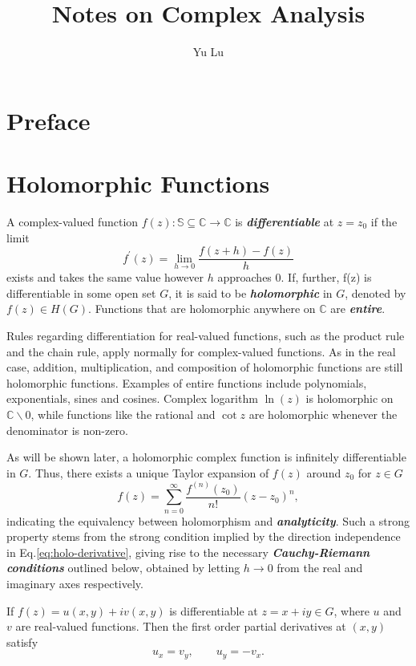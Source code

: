 \documentclass{article}
\title{Notes on Complex Analysis}
\author{Yu Lu}
\begin{document}
\maketitle
\section*{Preface}
\section{Holomorphic Functions} 
A complex-valued function $
    f(z)\colon \mathbb{S}\subseteq \mathbb{C} \to \mathbb{C}
$
is \textit{\textbf{differentiable}} at $z=z_0$ if the limit 
\begin{equation}
    f^\prime (z) = \lim\limits_{h \to 0} \frac{f(z+h)-f(z)}{h}
    \label{eq:holo-derivative}
\end{equation}
exists and takes the same value however $h$ approaches $0$. If, further, f(z) is differentiable in some open set $G$, it is said to be \textit{\textbf{holomorphic}} in $G$, denoted by $f(z) \in H(G)$. Functions that are holomorphic anywhere on $\mathbb{C}$ are \textit{\textbf{entire}}. 

Rules regarding differentiation for real-valued functions, such as the product rule and the chain rule, apply normally for complex-valued functions. As in the real case, addition, multiplication, and composition of holomorphic functions are still holomorphic functions. Examples of entire functions include polynomials, exponentials, sines and cosines. Complex logarithm $\ln(z)$ is holomorphic on $\mathbb{C}\backslash 0$, while functions like the rational and $\cot{z}$ are holomorphic whenever the denominator is non-zero. 

As will be shown later, a holomorphic complex function is infinitely differentiable in $G$. Thus, there exists a unique Taylor expansion of $f(z)$ around $z_0$ for $z \in G$
\begin{equation*}
    f(z) = \sum\limits_{n=0}^{\infty} \frac{f^{(n)}(z_0)}{n!} (z-z_0)^n,
\end{equation*}
indicating the equivalency between holomorphism and \textit{\textbf{analyticity}}. Such a strong property stems from the strong condition implied by the direction independence in Eq.\eqref{eq:holo-derivative}, giving rise to the necessary \textit{\textbf{Cauchy-Riemann conditions}} outlined below, obtained by letting $h \to 0$ from the real and imaginary axes respectively.  

\begin{frm-thm}
If \(f(z) = u(x,y)+i v(x,y)\) is differentiable at \(z = x+iy \in G\), where $u$ and $v$ are real-valued functions. Then the first order partial derivatives at $(x,y)$ satisfy 
\[
    u_{x} = v_{y} , \qquad u_{y}  = -v_{x}.  
    \label{thm:holo-CRconditions} 
\] 
\end{frm-thm}
\end{document}
